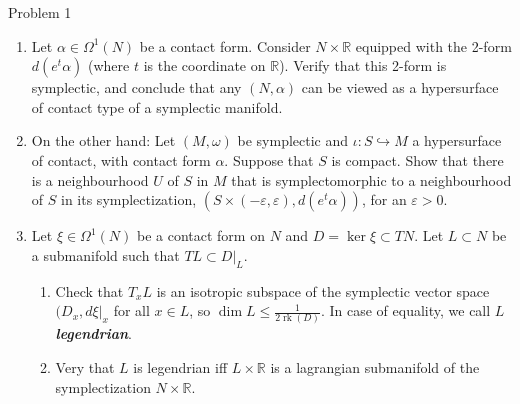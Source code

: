 \begin{thing4}{Problem 1}\leavevmode
\begin{enumerate}[label=(\alph*)]
\item Let  $\alpha \in \Omega^{1}(N)$ be a contact form. Consider $N \times \mathbb{R}$ equipped with the 2-form $d(e^t\alpha)$ (where $t$ is the coordinate on $\mathbb{R}$). Verify that this 2-form is symplectic, and conclude that any $(N,\alpha)$ can be viewed as a hypersurface of contact type of a symplectic manifold.

\item On the other hand: Let $(M,\omega)$ be symplectic and $\iota:S\hookrightarrow M$ a hypersurface of contact, with contact form $\alpha$. Suppose that $S$ is compact. Show that there is a neighbourhood $U$ of $S$ in $M$ that is symplectomorphic to a neighbourhood of $S$ in its symplectization, $(S \times (-\varepsilon, \varepsilon), d (e^t \alpha))$, for an $\varepsilon>0$.

\item Let $\xi \in \Omega^{1}(N)$ be a contact form on $N$ and $D=\ker \xi\subset TN$. Let $ L \subset N$ be a submanifold such that $ TL \subset D|_{ L}$.
	\begin{enumerate}[label=(\arabic*)]
	\item Check that $T_x L$ is an isotropic subspace of the symplectic vector space  $(D_x, d \xi|_{x}$ for all $x \in L$, so  $ \dim L \leq  \frac{1}{2 \operatorname{rk}(D)}$. In case of equality, we call $L$ \textit{\textbf{legendrian}}.
	\item Very that $L$ is legendrian iff $L \times \mathbb{R}$ is a lagrangian submanifold of the symplectization  $ N \times \mathbb{R}$.
	\end{enumerate}
\end{enumerate}
\end{thing4}

